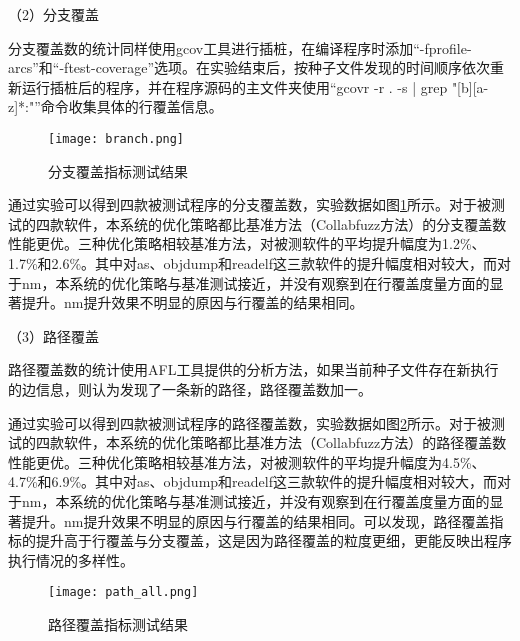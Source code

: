 \documentclass[master]{thesis-uestc}
\begin{document}
（2）分支覆盖

分支覆盖数的统计同样使用gcov工具进行插桩，在编译程序时添加“-fprofile-arcs”和“-ftest-coverage”选项。在实验结束后，按种子文件发现的时间顺序依次重新运行插桩后的程序，并在程序源码的主文件夹使用“gcovr -r . -s | grep "[b][a-z]*:"”命令收集具体的行覆盖信息。

\begin{figure}[!htbp]
    \vspace{6pt}
    \centering
    \texttt{[image: branch.png]}
    \caption{分支覆盖指标测试结果}
    \label{branch}
\end{figure}


通过实验可以得到四款被测试程序的分支覆盖数，实验数据如图\ref{branch}所示。对于被测试的四款软件，本系统的优化策略都比基准方法（Collabfuzz方法）的分支覆盖数性能更优。三种优化策略相较基准方法，对被测软件的平均提升幅度为1.2\%、1.7\%和2.6\%。其中对as、objdump和readelf这三款软件的提升幅度相对较大，而对于nm，本系统的优化策略与基准测试接近，并没有观察到在行覆盖度量方面的显著提升。nm提升效果不明显的原因与行覆盖的结果相同。

（3）路径覆盖

路径覆盖数的统计使用AFL工具提供的分析方法，如果当前种子文件存在新执行的边信息，则认为发现了一条新的路径，路径覆盖数加一。

通过实验可以得到四款被测试程序的路径覆盖数，实验数据如图\ref{path_all}所示。对于被测试的四款软件，本系统的优化策略都比基准方法（Collabfuzz方法）的路径覆盖数性能更优。三种优化策略相较基准方法，对被测软件的平均提升幅度为4.5\%、4.7\%和6.9\%。其中对as、objdump和readelf这三款软件的提升幅度相对较大，而对于nm，本系统的优化策略与基准测试接近，并没有观察到在行覆盖度量方面的显著提升。nm提升效果不明显的原因与行覆盖的结果相同。可以发现，路径覆盖指标的提升高于行覆盖与分支覆盖，这是因为路径覆盖的粒度更细，更能反映出程序执行情况的多样性。

\begin{figure}[t]
    \vspace{6pt}
    \centering
    \texttt{[image: path\_all.png]}
    \caption{路径覆盖指标测试结果}
    \label{path_all}
\end{figure}
\end{document}
